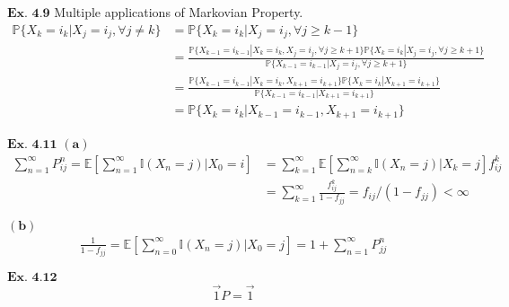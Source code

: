 \documentclass{article}
\begin{document}
\vspace{0.2in}
\begin{comment}
${\textbf{Ex. 4.8}}$

\vspace{0.2in}
\end{comment}
${\textbf{Ex. 4.9}}$
Multiple applications of Markovian Property.
\begin{align*}
\mathbb{P}\{X_{k}=i_k|X_j = i_j, \forall j \neq k\} &= \mathbb{P}\{X_{k}=i_k|X_{j} = i_{j}, \forall j\geq k-1\}\\
&= \frac{\mathbb{P}\{X_{k-1}=i_{k-1}|X_k=i_k, X_{j}=i_{j}, \forall j\geq k+1\}\mathbb{P}\{X_{k}=i_k|X_{j}=i_{j}, \forall j\geq k+1\}}{\mathbb{P}\{X_{k-1}=i_{k-1}|X_{j}=i_{j}, \forall j\geq k+1\}}\\
&= \frac{\mathbb{P}\{X_{k-1}=i_{k-1}|X_k=i_k, X_{k+1}=i_{k+1}\}\mathbb{P}\{X_{k}=i_k|X_{k+1}=i_{k+1}\}}{\mathbb{P}\{X_{k-1}=i_{k-1}|X_{k+1}=i_{k+1}\}}\\
&= \mathbb{P}\{X_{k}=i_{k}|X_{k-1}=i_{k-1}, X_{k+1}=i_{k+1}\}
\end{align*}

\vspace{0.2in}
\begin{comment}
${\textbf{Ex. 4.10}}$

\vspace{0.2in}
\end{comment}
${\textbf{Ex. 4.11}}$
$\mathbf{(a)}$
\begin{align*}
\sum_{n=1}^{\infty}P_{ij}^{n} = \mathbb{E}\left[\sum_{n=1}^{\infty}\mathbb{I}(X_n=j)|X_0=i\right] &= \sum_{k=1}^{\infty}\mathbb{E}\left[\sum_{n=k}^{\infty}\mathbb{I}(X_n=j)|X_k=j\right]f_{ij}^{k}\\
&= \sum_{k=1}^{\infty}\frac{f_{ij}^{k}}{1-f_{jj}} = f_{ij}/(1-f_{jj}) < \infty
\end{align*}

$\mathbf{(b)}$
\begin{align*}
\frac{1}{1-f_{jj}} = \mathbb{E}\left[\sum_{n=0}^{\infty}\mathbb{I}(X_n=j)|X_0=j\right] = 1+\sum_{n=1}^{\infty}P_{jj}^{n}
\end{align*}

\vspace{0.2in}
${\textbf{Ex. 4.12}}$
\begin{align*}
\vec{1}P = \vec{1}
\end{align*}
\end{document}
